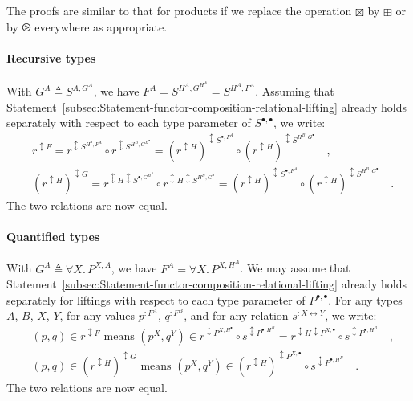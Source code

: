 The proofs are similar to that for products if we replace the operation
$\boxtimes$ by $\boxplus$ or by $\ogreaterthan$ everywhere as appropriate.

\paragraph{Recursive types}

With $G^{A}\triangleq S^{A,G^{A}}$, we have $F^{A}=S^{H^{A},G^{H^{A}}}=S^{H^{A},F^{A}}$.
Assuming that Statement~\ref{subsec:Statement-functor-composition-relational-lifting}
already holds separately with respect to each type parameter of $S^{\bullet,\bullet}$,
we write:
\begin{align*}
 & r^{\updownarrow F}=r^{\updownarrow S^{H^{\bullet},F^{A}}}\circ r^{\updownarrow S^{H^{B},G^{H^{\bullet}}}}=(r^{\updownarrow H})^{\updownarrow S^{\bullet,F^{A}}}\circ(r^{\updownarrow H})^{\updownarrow S^{H^{B},G^{\bullet}}}\quad,\\
 & (r^{\updownarrow H})^{\updownarrow G}=r^{\updownarrow H\updownarrow S^{\bullet,G^{H^{A}}}}\circ r^{\updownarrow H\updownarrow S^{H^{B},G^{\bullet}}}=(r^{\updownarrow H})^{\updownarrow S^{\bullet,F^{A}}}\circ(r^{\updownarrow H})^{\updownarrow S^{H^{B},G^{\bullet}}}\quad.
\end{align*}
The two relations are now equal.

\paragraph{Quantified types}

With $G^{A}\triangleq\forall X.\,P^{X,A}$, we have $F^{A}=\forall X.\,P^{X,H^{A}}$.
We may assume that Statement~\ref{subsec:Statement-functor-composition-relational-lifting}
already holds separately for liftings with respect to each type parameter
of $P^{\bullet,\bullet}$. For any types $A$, $B$, $X$, $Y$, for
any values $p^{:F^{A}}$, $q^{:F^{B}}$, and for any relation $s^{:X\leftrightarrow Y}$,
we write:
\begin{align*}
 & (p,q)\in r^{\updownarrow F}\text{ means }(p^{X},q^{Y})\in r^{\updownarrow P^{X,H^{\bullet}}}\circ s^{\updownarrow P^{\bullet,H^{B}}}=r^{\updownarrow H\updownarrow P^{X,\bullet}}\circ s^{\updownarrow P^{\bullet,H^{B}}}\quad,\\
 & (p,q)\in(r^{\updownarrow H})^{\updownarrow G}\text{ means }(p^{X},q^{Y})\in(r^{\updownarrow H})^{\updownarrow P^{X,\bullet}}\circ s^{\updownarrow P^{\bullet,H^{B}}}\quad.
\end{align*}
The two relations are now equal.


